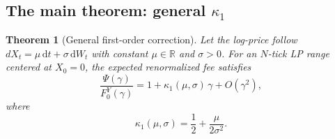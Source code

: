 \documentclass[11pt]{article}
\newtheorem{theorem}{Theorem}[section]
\theoremstyle{definition}
\theoremstyle{remark}
\newcommand{\R}{\mathbb{R}}
\newcommand{\dd}{\,\mathrm{d}}
\begin{document}
\subsection{The main theorem: general $\kappa_1$}

\begin{theorem}[General first-order correction]\label{thm:general_kappa1}
Let the log-price follow $dX_t = \mu\dd t + \sigma\dd W_t$ with
constant $\mu \in \R$ and $\sigma > 0$. For an $N$-tick LP range
centered at $X_0 = 0$, the expected renormalized fee satisfies
\begin{equation}\label{eq:general_kappa1}
\frac{\Psi(\gamma)}{F_0^Y(\gamma)}
= 1 + \kappa_1(\mu, \sigma)\,\gamma + O(\gamma^2),
\end{equation}
where
\begin{equation}\label{eq:kappa1_formula}
\kappa_1(\mu, \sigma)
= \frac{1}{2} + \frac{\mu}{2\sigma^2}.
\end{equation}
\end{theorem}
\end{document}
